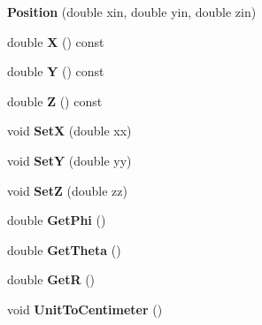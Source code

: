 \begin{DoxyCompactItemize}
\item 
\hypertarget{classPosition_a324c80892d3dcba7c99319102f9ca9ed}{{\bfseries Position} (double xin, double yin, double zin)}\label{classPosition_a324c80892d3dcba7c99319102f9ca9ed}

\item 
\hypertarget{classPosition_a7d829a2e612447d00d7965714045bb9a}{double {\bfseries X} () const }\label{classPosition_a7d829a2e612447d00d7965714045bb9a}

\item 
\hypertarget{classPosition_a2d318ced6e936e9c18225a290a32fdcb}{double {\bfseries Y} () const }\label{classPosition_a2d318ced6e936e9c18225a290a32fdcb}

\item 
\hypertarget{classPosition_aa57d77c97e6a3ef617ff5227053de6af}{double {\bfseries Z} () const }\label{classPosition_aa57d77c97e6a3ef617ff5227053de6af}

\item 
\hypertarget{classPosition_a3ea3a7594f1c164ceb06053f0e3fac02}{void {\bfseries Set\-X} (double xx)}\label{classPosition_a3ea3a7594f1c164ceb06053f0e3fac02}

\item 
\hypertarget{classPosition_a6a288f1fe2c5f642bba613828f2f38e2}{void {\bfseries Set\-Y} (double yy)}\label{classPosition_a6a288f1fe2c5f642bba613828f2f38e2}

\item 
\hypertarget{classPosition_a70362eb60d97b0229f234f3e72fbf625}{void {\bfseries Set\-Z} (double zz)}\label{classPosition_a70362eb60d97b0229f234f3e72fbf625}

\item 
\hypertarget{classPosition_aeb4bd6d16d803853b477d9fb08078619}{double {\bfseries Get\-Phi} ()}\label{classPosition_aeb4bd6d16d803853b477d9fb08078619}

\item 
\hypertarget{classPosition_a2abfd5065053d48f6d7808b1b024a07e}{double {\bfseries Get\-Theta} ()}\label{classPosition_a2abfd5065053d48f6d7808b1b024a07e}

\item 
\hypertarget{classPosition_a9d6bafb2c4b8e4a69aed1ec717f0a898}{double {\bfseries Get\-R} ()}\label{classPosition_a9d6bafb2c4b8e4a69aed1ec717f0a898}

\item 
\hypertarget{classPosition_a917945e24d7307e45658e0d45596eab9}{void {\bfseries Unit\-To\-Centimeter} ()}\label{classPosition_a917945e24d7307e45658e0d45596eab9}


\end{DoxyCompactItemize}
